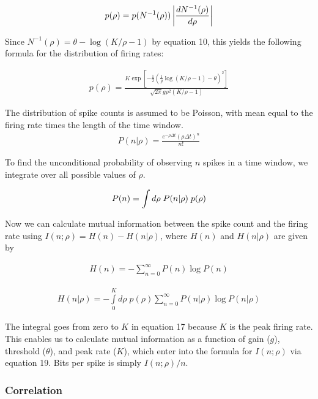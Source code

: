 \documentclass[12pt]{article}
\begin{document}
\begin{align}
\displaystyle p(\rho) = p(N^{-1}(\rho))\left | \frac{dN^{-1}(\rho)}{d\rho} \right | \notag
\end{align}

\noindent Since $\displaystyle N^{-1}(\rho)= \theta - \log(K/\rho-1)$ by equation 10, this yields the following formula for the distribution of firing rates:

\begin{align}
\displaystyle p(\rho) = \frac{K\exp\left[ -\frac{1}{2}\left( \frac{1}{g}\log(K/\rho-1)-\theta\right)^2\right]}{\sqrt{2\pi}g\rho^2(K/\rho-1)} \tag{19}
\end{align}

\noindent The distribution of spike counts is assumed to be Poisson, with mean equal to the firing rate times the length of the time window.
\begin{align}
\displaystyle P(n|\rho) = \frac{e^{-\rho\Delta t}(\rho \Delta t)^n}{n!} \tag{9}
\end{align}

\noindent To find the unconditional probability of observing $n$ spikes in a time window, we integrate over all possible values of $\rho$.

\begin{align}
\displaystyle P(n) =\int d\rho \; P(n|\rho) \; p(\rho) \notag
\end{align}

\noindent Now we can calculate mutual information between the spike count and the firing rate using $I(n;\rho)=H(n)-H(n|\rho)$, where $H(n)$ and $H(n|\rho)$ are given by

\begin{align}
\displaystyle H(n) = -\sum\limits_{n=0}^\infty P(n)\log P(n) \tag{16}
\end{align}

\begin{align}
\displaystyle H(n|\rho) = -\int\limits_0^K d\rho \; p(\rho) \sum\limits_{n=0}^\infty P(n|\rho) \log P(n|\rho) \tag{17}
\end{align}

\noindent The integral goes from zero to $K$ in equation 17 because $K$ is the peak firing rate. This enables us to calculate mutual information as a function of gain ($g$), threshold ($\theta$), and peak rate ($K$), which enter into the formula for $I(n;\rho)$ via equation 19. Bits per spike is simply $I(n;\rho)/n$.

\subsubsection{Correlation}
\end{document}
